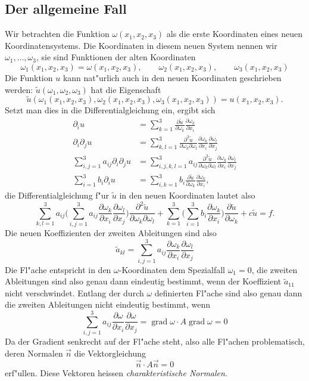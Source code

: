 \subsection{Der allgemeine Fall}
Wir betrachten die Funktion $\omega(x_1,x_2,x_3)$ als die erste
Koordinaten eines neuen Koordinatensystems. Die Koordinaten in diesem
neuen System nennen wir $\omega_1,\dots,\omega_3$, sie sind Funktionen
der alten Koordinaten
\[
\omega_1(x_1,x_2,x_3)=\omega(x_1,x_2,x_3)
,\qquad
\omega_2(x_1,x_2,x_3)
,\qquad
\omega_3(x_1,x_2,x_3)
\]
Die Funktion $u$ kann nat"urlich auch in den neuen Koordinaten geschrieben
werden: $\tilde u(\omega_1,\omega_2,\omega_3)$ hat die Eigenschaft
\[
\tilde u(
\omega_1(x_1,x_2,x_3),
\omega_2(x_1,x_2,x_3),
\omega_3(x_1,x_2,x_3)) = u(x_1,x_2,x_3).
\]
Setzt man dies in die Differentialgleichung ein, ergibt sich
\begin{align*}
\partial_iu
&=
\sum_{k=1}^3
\frac{\partial\tilde u}{\partial \omega_k}
\frac{\partial\omega_k}{\partial x_i}
\\
\partial_i\partial_ju
&=
\sum_{k,l=1}^3
\frac{\partial^2\tilde u}{\partial \omega_k\partial\omega_l}
\frac{\partial\omega_k}{\partial x_i}
\frac{\partial\omega_l}{\partial x_j}
\\
\sum_{i,j=1}^3a_{ij}\partial_i\partial_ju
&=
\sum_{i,j,k,l=1}^3a_{ij}
\frac{\partial^2\tilde u}{\partial \omega_k\partial\omega_l}
\frac{\partial\omega_k}{\partial x_i}
\frac{\partial\omega_l}{\partial x_j}
\\
\sum_{i=1}^3b_i\partial_iu
&=
\sum_{i,k=1}^3b_i
\frac{\partial\tilde u}{\partial \omega_k}
\frac{\partial\omega_k}{\partial x_i},
\end{align*}
die Differentialgleichung f"ur $\tilde u$ in den neuen 
Koordinaten lautet also
\[
\sum_{k,l=1}^3a_{ij}
\biggl(
\sum_{i,j=1}^3a_{ij}
\frac{\partial\omega_k}{\partial x_i}
\frac{\partial\omega_l}{\partial x_j}
\biggr)
\frac{\partial^2\tilde u}{\partial \omega_k\partial\omega_l}
+
\sum_{k=1}^3
\biggl(
\sum_{i=1}^3
b_i
\frac{\partial\omega_k}{\partial x_i}
\biggr)
\frac{\partial\tilde u}{\partial \omega_k}
+c\tilde u
=f.
\]
Die neuen Koeffizienten der zweiten Ableitungen sind also
\[
\tilde a_{kl}=
\sum_{i,j=1}^3a_{ij}
\frac{\partial\omega_k}{\partial x_i}
\frac{\partial\omega_l}{\partial x_j}
\]
Die Fl"ache entspricht in den $\omega$-Koordinaten dem Spezialfall $\omega_1=0$,
die zweiten Ableitungen sind also genau dann eindeutig bestimmt, wenn
der Koeffizient $\tilde a_{11}$ nicht verschwindet. Entlang der durch $\omega$
definierten Fl"ache sind also genau dann die zweiten Ableitungen nicht eindeutig
bestimmt, wenn 
\[
\sum_{i,j=1}^3
a_{ij}
\frac{\partial\omega}{\partial x_i}
\frac{\partial\omega}{\partial x_j}
=
\operatorname{grad}\omega
\cdot
A
\operatorname{grad}\omega
=0
\]
Da der Gradient senkrecht auf der Fl"ache steht, also alle Fl"achen
problematisch, deren Normalen $\vec n$ die Vektorgleichung
\[
\vec n\cdot A\vec n=0
\]
erf"ullen. Diese Vektoren heissen {\em charakteristische Normalen}.

